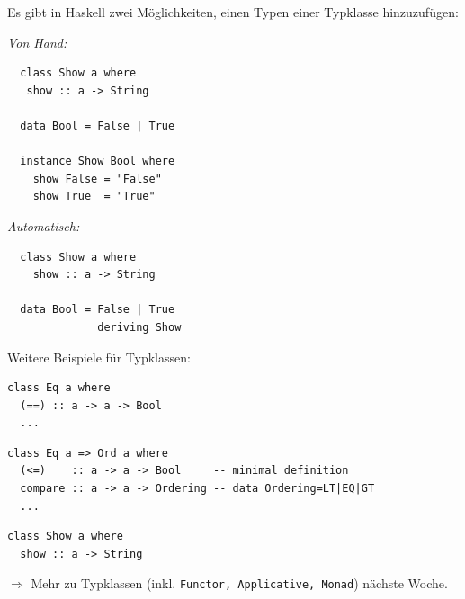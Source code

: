 \documentclass[unknownkeysallowed]{beamer}
\begin{document}
  
  \begin{frame}[fragile]
  
  Es gibt in Haskell zwei Möglichkeiten, einen Typen einer Typklasse hinzuzufügen:\pause  
  
  \begin{multicols}{2}
  \emph{Von Hand:}
  
  \begin{verbatim}
  class Show a where
   show :: a -> String
  
  data Bool = False | True

  instance Show Bool where
    show False = "False"
    show True  = "True"
  \end{verbatim}
  
  \pause
  \columnbreak  
  \emph{Automatisch:}
  
  \begin{verbatim}
  class Show a where
    show :: a -> String  
  
  data Bool = False | True 
              deriving Show
  \end{verbatim}
  \end{multicols} 
  
\end{frame}


  \begin{frame}[fragile]
  
  Weitere Beispiele für Typklassen: \pause

  \begin{verbatim}
class Eq a where
  (==) :: a -> a -> Bool
  ...
  \end{verbatim}
  
  \pause
  
  \begin{verbatim}
class Eq a => Ord a where
  (<=)    :: a -> a -> Bool     -- minimal definition
  compare :: a -> a -> Ordering -- data Ordering=LT|EQ|GT
  ...
  \end{verbatim}
  
  \pause
  
  \begin{verbatim}
class Show a where
  show :: a -> String
  \end{verbatim}
  
  \pause
  
  $\Rightarrow$ Mehr zu Typklassen (inkl. \texttt{Functor, Applicative, Monad}) 
  nächste Woche.

\end{frame}
\end{document}
